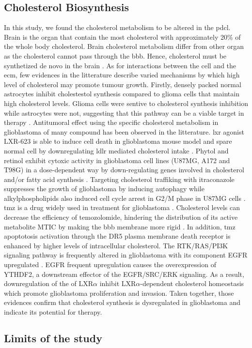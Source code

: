 \subsection{Cholesterol Biosynthesis}

In this study, we found the cholesterol metabolism to be altered in the \acrshort{pdcl}.
Brain is the organ that contain the most cholesterol with approximately 20\% of the whole body cholesterol.
Brain cholesterol metabolism differ from other organ as the cholesterol cannot pass through the \acrfull{bbb}.
Hence, cholesterol must be synthetized de novo in the brain \cite*{Villa2016,Yamamoto2018,Pirmoradi2019}.
As for interactions between the cell and the \acrlong{ecm}, few evidences in the litterature describe varied mechanisms by which high level of cholesterol may promote tumour growth.
Firstly, densely packed normal astrocytes inhibit cholestestol synthesis compared to glioma cells that maintain high cholesterol levels.
Glioma cells were sentive to cholesterol synthesis inhibition while astrocytes were not, suggesting that this pathway can be a viable target in therapy \cite*{Kambach2017}.
Antitumoral effect using the specific cholesterol metabolism in glioblastoma of many compound has been observed in the litterature.
\acrfull{lxr} agonist LXR-623 is able to induce cell death in glioblastoma mouse model and spare normal cell by downregulating \acrfull{ldlr} mediated cholesterol intake \cite*{Villa2016, Pirmoradi2019}.
Phytol and retinol exhibit cytoxic activity in glioblastoma cell lines (U87MG, A172 and T98G) in a dose-dependent way by down-regulating genes involved in cholesterol and/or fatty acid synthesis \cite*{Facchini2018}.
Targeting cholesterol traffiking with itraconazole suppresses the growth of glioblastoma by inducing autophagy \cite*{Liu2014} while alkylphospholipids also induced cell cycle arrest in G2/M phase  in U87MG cells \cite*{Rios-Marco2013}.
\acrfull{tmz} is a drug widely used in treatment for glioblastoma \cite*{Stephanou2019}.
Cholesterol levels can decrease the efficiency of temozolomide, hindering the distribution of its active metabolite MTIC by making the \acrshort{bbb} membrane more rigid \cite*{Ramalho2019}.
In addition, \acrshort{tmz} apoptotosis activation through the DR5 plasma membrane death receptor is enhanced by higher levels of intracellular cholesterol.
The RTK/RAS/PI3K signaling pathway is frequently altered in glioblastoma with its component EGFR upregulated \cite*{McLendon2008}.
EGFR frequent upregulation causes the overexpression of YTHDF2, a downstream effector of the EGFR/SRC/ERK signaling.
As a result, downregulation of the of LXR$\alpha$ inhibit LXR$\alpha$-dependent cholesterol homeostasis which promote glioblastoma proliferation and invasion. 
Taken together, those evidences confirm that cholesterol synthesis is dysregulated in glioblastoma and indicate its potential for therapy.

\subsection{Limits of the study}

